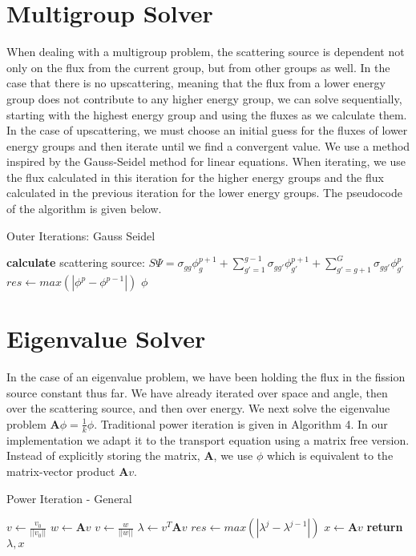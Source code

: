 \section{Multigroup Solver}
When dealing with a multigroup problem, the scattering source is dependent not only on the flux from the current group, but from other groups as well. In the case that there is no upscattering, meaning that the flux from a lower energy group does not contribute to any higher energy group, we can solve sequentially, starting with the highest energy group and using the fluxes as we calculate them. In the case of upscattering, we must choose an initial guess for the fluxes of lower energy groups and then iterate until we find a convergent value. We use a method inspired by the Gauss-Seidel method for linear equations. When iterating, we use the flux calculated in this iteration for the higher energy groups and the flux calculated in the previous iteration for the lower energy groups. The pseudocode of the algorithm is given below. 
\begin{algorithm}
\caption{Outer Iterations: Gauss Seidel}
\begin{algorithmic}
     
            \State \textbf{calculate} scattering source: \State $S\Psi = \sigma_{gg}\phi_g^{p+1} + \sum\limits_{g'=1}^{g-1} \sigma_{gg'} \phi_{g'}^{p+1} + \sum\limits_{g'=g+1}^G \sigma_{gg'}\phi_{g'}^p$
        \EndProcedure
        \EndFor
        \State $res \gets max(|\phi^{p} - \phi^{p-1}|)$  
        \EndWhile
    \Return $\phi$
\end{algorithmic}
\end{algorithm}

\section{Eigenvalue Solver}
In the case of an eigenvalue problem, we have been holding the flux in the fission source constant thus far. We have already iterated over space and angle, then over the scattering source, and then over energy. We next solve the eigenvalue problem $\textbf{A}\phi = \frac{1}{k}\phi$. Traditional power iteration is given in Algorithm 4. In our implementation we adapt it to the transport equation using a matrix free version. Instead of explicitly storing the matrix, $\textbf{A}$, we use $\phi$ which is  equivalent to the matrix-vector product $\textbf{A}v$.
\begin{algorithm}
\caption{Power Iteration - General}
\begin{algorithmic}
    \State $v \gets \frac{v_0}{||v_0||}$ 
     
        \State $w \gets \textbf{A}v$
        \State $v \gets \frac{w}{|| w||}$
        \State $\lambda \gets v^T\textbf{A}v$
        \State $res \gets max(|\lambda^j - \lambda^{j-1}|)$
    \EndWhile
    \State $x \gets \textbf{A}v$
    \State \textbf{return} $\lambda, x$
\end{algorithmic}
\end{algorithm}

